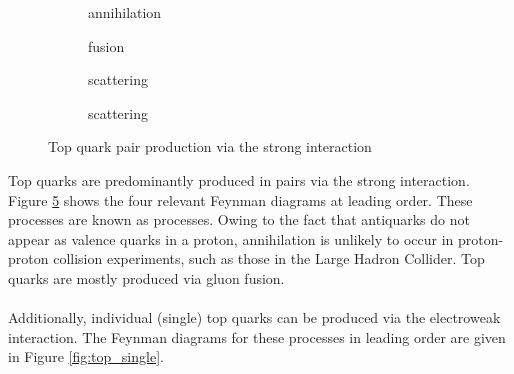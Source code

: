 \begin{figure}[h]
    \centering
    \begin{subfigure}{.2\textwidth}
        \centering
        
        \caption{\qqbar annihilation}
        \label{fig:top_pair_qqbar}
    \end{subfigure}\hfill
    \begin{subfigure}{.2\textwidth}
        \centering
        
        \caption{\PgluonNOSPACE\Pgluon fusion}
        \label{fig:top_pair_gg}
    \end{subfigure}\hfill
    \begin{subfigure}{.2\textwidth}
        \centering
        
        \caption{\PgluonNOSPACE\Pgluon scattering}
        \label{fig:top_pair_gg_scatter}
    \end{subfigure}\hfill
    \begin{subfigure}{.2\textwidth}
        \centering
        
        \caption{\PgluonNOSPACE\Pgluon scattering}
        \label{fig:top_pair_gg_scatter_t}
    \end{subfigure}
    \caption{Top quark pair production via the strong interaction}
    \label{fig:top_pair}
\end{figure}

Top quarks are predominantly produced in pairs via the strong interaction. Figure \ref{fig:top_pair} shows the four relevant Feynman diagrams at leading order. These processes are known as \ttbar processes. Owing to the fact that antiquarks do not appear as valence quarks in a proton, \qqbar annihilation is unlikely to occur in proton-proton collision experiments, such as those in the Large Hadron Collider. Top quarks are mostly produced via gluon fusion.\\ \\
Additionally, individual (single) top quarks can be produced via the electroweak interaction. The Feynman diagrams for these processes in leading order are given in Figure \ref{fig:top_single}.

